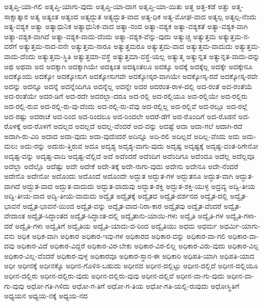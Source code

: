 {ಅತೃಪ್ತಿ-ಯಾ-ಗಲಿ
ಅತೃಪ್ತಿ-ಯಾಗು-ವುದು
ಅತೃಪ್ತಿ-ಯಾ-ದಾಗ
ಅತೃಪ್ತಿ-ಯಾ-ಯಿತು
ಅತ್ತ
ಅತ್ತ-ಕಡೆ
ಅತ್ತು
ಅತ್ಮ-ಸಾಕ್ಷಾತ್ಕಾರ
ಅತ್ಯ
ಅತ್ಯಂತ
ಅತ್ಯಂದ
ಅತ್ಯದ್ಭುತ
ಅತ್ಯದ್ಭುತ-ವಾದ
ಅತ್ಯ-ಧಿಕ
ಅತ್ಯ-ಮೋಘ-ವಾದ
ಅತ್ಯಲ್ಪ
ಅತ್ಯಲ್ಪ-ನೆಂದು
ಅತ್ಯ-ವಶ್ಯಕ
ಅತ್ಯಾ
ಅತ್ಯಾಧುನಿಕ
ಅತ್ಯಾಧುನಿಕ-ವಾದ
ಅತ್ಯಾ-ನಂದ
ಅತ್ಯಾ-ವಶ್ಯಕ
ಅತ್ಯಾ-ವಶ್ಯಕತೆ
ಅತ್ಯಾ-ವಶ್ಯಕ-ವಾಗಿ
ಅತ್ಯಾ-ವಶ್ಯಕ-ವಾಗಿದೆ
ಅತ್ಯಾ-ವಶ್ಯಕ-ವಾದು-ದೆಂದು
ಅತ್ಯಾ-ವಶ್ಯಕ-ವೆನ್ನು-ವುದು
ಅತ್ಯುಚ್ಚ
ಅತ್ಯುತ್ತಮ
ಅತ್ಯುತ್ತಮ-ನ-ವರೆಗೆ
ಅತ್ಯುತ್ತಮ-ನಾದ-ವನೇ
ಅತ್ಯುತ್ತಮ-ನಾರೂ
ಅತ್ಯುತ್ತಮರೂ
ಅತ್ಯುತ್ತಮ-ವಾದ
ಅತ್ಯುತ್ತಮ-ವಾದುದು
ಅತ್ಯುತ್ತಮ-ವಾದು-ದೆಂದು
ಅತ್ಯುತ್ತಮ-ಸ್ಥಿತಿ
ಅತ್ಯುತ್ತಮಾ-ವಸ್ಥೆ
ಅತ್ಯುತ್ತಮಾ-ವಸ್ಥೆ-ಯಲ್ಲ
ಅತ್ಯುತ್ಮ
ಅತ್ಯುನ್ನತ
ಅತ್ಯುನ್ನತ-ವಾದು-ದನ್ನು
ಅಥ
ಅಥವಾ
ಅದ
ಅದಕ್ಕಾಗಿ
ಅದಕ್ಕಾಗಿಯೇ
ಅದಕ್ಕಿಂತ
ಅದಕ್ಕಿಂತಲೂ
ಅದಕ್ಕೂ
ಅದಕ್ಕೆ
ಅದಕ್ಕೆಲ್ಲ
ಅದಕ್ಕೇ
ಅದಕ್ಕೇನೂ
ಅದಕ್ಕೊಂದು
ಅದಕ್ಕೋ
ಅದಕ್ಕೋಸುಗ
ಅದಕ್ಕೋಸುಗವೇ
ಅದಕ್ಕೋಸ್ಕರ-ವಾಗಿಯೇ
ಅದಕ್ಕೋಸ್ಕ-ರವೆ
ಅದಕ್ಕೋಸ್ಕ-ರವೇ
ಅದನ್ನು
ಅದನ್ನೂ
ಅದನ್ನೆ
ಅದನ್ನೆಂದಿಗೂ
ಅದನ್ನೆಲ್ಲ
ಅದನ್ನೇ
ಅದರ
ಅದರಂತ-ರಾಳ-ದಲ್ಲಿ
ಅದ-ರಂತೆ
ಅದ-ರಂತೆಯೆ
ಅದ-ರಂತೆಯೇ
ಅದರ-ಡಿಗೆ
ಅದ-ರದೇ
ಅದರಲ್ಲಾ-ದರೂ
ಅದ-ರಲ್ಲಿ
ಅದ-ರಲ್ಲಿಯೂ
ಅದ-ರಲ್ಲಿಯೇ
ಅದ-ರಲ್ಲಿರು
ಅದ-ರಲ್ಲಿ-ರುವ
ಅದ-ರಲ್ಲಿ-ರು-ವು-ದೆಂದು
ಅದ-ರಲ್ಲಿ-ರು-ವೆವು
ಅದ-ರಲ್ಲಿಲ್ಲ
ಅದ-ರಲ್ಲಿವೆ
ಅದ-ರಲ್ಲೂ
ಅದ-ರಲ್ಲೆ
ಅದ-ರಷ್ಟು
ಅದರಾಚೆ
ಅದ-ರಿಂದ
ಅದ-ರಿಂದಲೂ
ಅದ-ರಿಂದಲೇ
ಅದರೆ-ಡೆಗೆ
ಅದ-ರೊಂದಿಗೆ
ಅದ-ರೊಡನೆ
ಅದ-ರೊಳಕ್ಕೆ
ಅದ-ರೊಳಗೆ
ಅದಲ್ಲದ
ಅದಲ್ಲದೆ
ಅದಲ್ಲ-ವೆಂದರೆ
ಅದ-ವನ್ನು
ಅದಷ್ಟೆ
ಅದಾ
ಅದಾ-ಗಲೆ
ಅದಾಗಿ-ರದೆ
ಅದಾಗಿ-ರು-ವಿರಿ
ಅದಾದ
ಅದಾ-ವುದು
ಅದಾ-ವುದೆಂದರೆ
ಅದಿನ್ನೂ
ಅದಿ-ರಲಿ
ಅದಿಲ್ಲದೆ
ಅದಿಲ್ಲ-ವೆಂದು
ಅದು
ಅದು-ಮಲು
ಅದು-ರನ್ನು
ಅದುರು-ತ್ತಿರುವ
ಅದೂ
ಅದೃಶ್ಯ
ಅದೃಶ್ಯ-ವಾಗು-ವುದು
ಅದೃಷ್ಟ
ಅದೃಷ್ಟಕ್ಕೆ
ಅದೃಷ್ಟ-ವಂತ-ರಿಗೇನೋ
ಅದೃಷ್ಟ-ವನ್ನು
ಅದೃಷ್ಟ-ವಾದಿ
ಅದೃಷ್ಟ-ವೆಲ್ಲಿದೆ
ಅದೆ
ಅದೆಂದರೆ
ಅದೆಂದಿಗ
ಅದೆಂದಿಗೂ
ಅದೆಂದೂ
ಅದೆಲ್ಲ
ಅದೆಲ್ಲವೂ
ಅದೆಲ್ಲಾ
ಅದೆಲ್ಲೊ
ಅದೆಷ್ಟು
ಅದೇ
ಅದೇಕೆ
ಅದೇ-ತಕ್ಕೆ
ಅದೇ-ನಾಗು-ವುದು
ಅದೇನು
ಅದೇನೂ
ಅದೇ-ನೆಂದರೆ
ಅದೇನೊ
ಅದೇನೋ
ಅದೊಂದು
ಅದೊಂದೆ
ಅದೊಂದೇ
ಅದ್ಭುತ
ಅದ್ಭುತ-ಗಳ
ಅದ್ಭುತನೂ
ಅದ್ಭುತ-ವಾಗಿ
ಅದ್ಭುತ-ವಾಗಿದೆ
ಅದ್ಭುತ-ವಾದ
ಅದ್ಭುತ-ವಾದುದು
ಅದ್ಭುತ-ವಾದುವು
ಅದ್ಭುತ-ಶಕ್ತಿ
ಅದ್ಭುತ-ಶಕ್ತಿ-ಯುಳ್ಳ
ಅದ್ರವ್ಯ
ಅದ್ವಿ-ತೀಯ
ಅದ್ವಿ-ತೀಯ-ವಾದ
ಅದ್ವಿ-ತೀಯ-ವಾದುದು
ಅದ್ವೈತ
ಅದ್ವೈತಕ್ಕೆ
ಅದ್ವೈತದ
ಅದ್ವೈತ-ದರ್ಶನದ
ಅದ್ವೈತ-ದಲ್ಲಿ
ಅದ್ವೈತ-ಭಾವನೆ
ಅದ್ವೈತ-ಭಾವನೆ-ಯಿಂದ
ಅದ್ವೈತ-ವನ್ನು
ಅದ್ವೈತ-ವಾದ-ನಿರಾ-ಕಾರ
ಅದ್ವೈತವು
ಅದ್ವೈತ-ವೆಂದರೆ
ಅದ್ವೈತ-ವೇದಾಂತ
ಅದ್ವೈತ-ಸಿದ್ಧಾಂತದ
ಅದ್ವೈತ-ಸಿದ್ಧಾಂತ-ದಲ್ಲಿ
ಅದ್ವೈತಾನು-ಯಾಯಿ-ಗಳು
ಅದ್ವೈತಿ
ಅದ್ವೈತಿ-ಗಳ
ಅದ್ವೈತಿ-ಗಳಾ-ದರೆ
ಅದ್ವೈತಿ-ಗಳು
ಅದ್ವೈತಿಗೆ
ಅದ್ವೈತಿಯ
ಅದ್ವೈತಿ-ಯಾದು-ದ-ರಿಂದ
ಅದ್ವೈತಿಯು
ಅಧಮ
ಅಧರ್ಮ
ಅಧರ್ಮಿ-ಯಾಗು-ವನು
ಅಧಿಕ
ಅಧಿಕ-ವಾಗಿ
ಅಧಿಕಾರ
ಅಧಿಕಾರ-ಇವು-ಗಳ
ಅಧಿಕಾರದ
ಅಧಿಕಾರ-ವನ್ನು
ಅಧಿಕಾರ-ವಾ-ಗಲಿ
ಅಧಿಕಾರ-ವಾ-ದವು
ಅಧಿಕಾರ-ವಿದೆ
ಅಧಿಕಾರ-ವಿದ್ದರೆ
ಅಧಿಕಾರ-ವಿರ-ಬೇಕು
ಅಧಿಕಾರ-ವಿರ-ಲಿಲ್ಲ
ಅಧಿಕಾರ-ವಿರು-ವುದು
ಅಧಿಕಾರ-ವಿಲ್ಲ
ಅಧಿಕಾರ-ವಿಲ್ಲ-ವೆಂದರೆ
ಅಧಿಕಾರ-ವುಳ್ಳ
ಅಧಿಕಾರವೂ
ಅಧಿಕಾರ-ಸ್ತಾನ-ಈ
ಅಧಿಕಾರಿ
ಅಧಿಪತಿ-ಯಾಗಿ
ಅಧಿಪತಿ-ಯಾದ
ಅಧೀ
ಅಧೀನಕ್ಕೆ
ಅಧೀನಕ್ಕೊ
ಅಧೀನ-ಗೊಳಿಸ-ಬಹುದು
ಅಧೀನದ
ಅಧೀನ-ದಲ್ಲಿಟ್ಟು
ಅಧೀನ-ದಲ್ಲಿದೆ
ಅಧೀನ-ದಲ್ಲಿಯೂ
ಅಧೀನ-ದಲ್ಲಿರು
ಅಧೀನ-ದಲ್ಲಿರು-ವುದು
ಅಧೀನ-ದಲ್ಲಿರು-ವುವು
ಅಧೀನ-ದಲ್ಲಿವೆ
ಅಧೀನ-ವಾ-ಗು-ವುದು
ಅಧೀನ-ವಾ-ಗು-ವುವು
ಅಧೋ-ಗತಿ-ಗಿಳಿದು
ಅಧೋ-ಗ-ತಿಗೆ
ಅಧೋ-ಗ-ತಿಯ
ಅಧೋ-ಗತಿ-ಯಲ್ಲಿ-ರುವುದು
ಅಧೋಸ್ಥಿತಿಗೆ
ಅಧ್ಯಯನ
ಅಧ್ಯಯ-ನಕ್ಕೆ
ಅಧ್ಯಯ-ನದ
}
